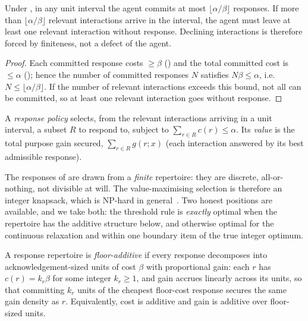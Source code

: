 \documentclass[11pt,twocolumn,a4paper]{article}
\newcommand{\resp}{r}                %
\newcommand{\floorc}{\beta}          %
\newcommand{\att}{\alpha}            %
\newcommand{\cost}{c}                %
\newcommand{\gain}{g}                %
\begin{document}
\begin{theorem}
\label{thm:inattention}
Under , in any unit interval the agent commits
at most $\lfloor\att/\floorc\rfloor$ responses. If more than
$\lfloor\att/\floorc\rfloor$ relevant interactions arrive in the interval,
the agent must leave at least one relevant interaction without response.
Declining interactions is therefore forced by finiteness, not a defect of
the agent.
\end{theorem}

\begin{proof}
Each committed response costs $\ge\floorc$ () and the total
committed cost is $\le\att$ (); hence the number of
committed responses $N$ satisfies $N\floorc\le\att$, i.e.
$N\le\lfloor\att/\floorc\rfloor$. If the number of relevant interactions
exceeds this bound, not all can be committed, so at least one relevant
interaction goes without response.
\end{proof}

\begin{definition}
\label{def:policy}
A \emph{response policy} selects, from the relevant interactions arriving
in a unit interval, a subset $R$ to respond to, subject to
$\sum_{\resp\in R}\cost(\resp)\le\att$. Its \emph{value} is the total
purpose gain secured, $\sum_{\resp\in R}\gain(\resp;x)$ (each interaction
answered by its best admissible response).
\end{definition}

The responses of  are drawn from a \emph{finite}
repertoire: they are discrete, all-or-nothing, not divisible at will. The
value-maximising selection is therefore an integer knapsack, which is
NP-hard in general~\cite{martello1990,kellerer2004,cormen2009}. Two honest positions are available, and we take both:
the threshold rule is \emph{exactly} optimal when the repertoire has the
additive structure below, and otherwise optimal for the continuous
relaxation and within one boundary item of the true integer optimum.

\begin{definition}
\label{def:additive}
A response repertoire is \emph{floor-additive} if every response decomposes
into acknowledgement-sized units of cost $\floorc$ with proportional gain:
each $\resp$ has $\cost(\resp)=k_\resp\floorc$ for some integer
$k_\resp\ge1$, and gain accrues linearly across its units, so that
committing $k_\resp$ units of the cheapest floor-cost response secures the
same gain density as $\resp$. Equivalently, cost is additive and gain is
additive over floor-sized units.
\end{definition}
\end{document}
